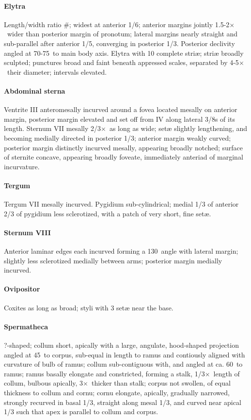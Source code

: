 \documentclass[fleqn,10pt,lineno]{wlpeerj} %
\newcommand{\td}{\textdegree~}
\newcommand{\x}{$\times$~}
\begin{document}
			\paragraph{Elytra}
				Length/width ratio \#; widest at anterior 1/6; anterior margins jointly 1.5-2\x wider than posterior margin of pronotum; lateral margins nearly straight and sub-parallel after anterior 1/5, converging in posterior 1/3. 
				Posterior declivity angled at 70-75\td to main body axis. Elytra with 10 complete stri{\ae}; stri{\ae} broadly sculpted; punctures broad and faint beneath appressed scales, separated by 4-5\x their diameter; intervals elevated.
			\paragraph{Abdominal sterna}
				Ventrite III anteromesally incurved around a fovea located mesally on anterior margin, posterior margin elevated and set off from IV along lateral 3/8s of its length. 
				Sternum VII mesally 2/3\x as long as wide; set{\ae} slightly lengthening, and becoming medially directed in posterior 1/3; anterior margin weakly curved; posterior margin distinctly incurved mesally, appearing broadly notched; surface of sternite concave, appearing broadly foveate, immediately anteriad of marginal incurvature.
			\paragraph{Tergum}
				Tergum VII mesally incurved.
				Pygidium sub-cylindrical; medial 1/3 of anterior 2/3 of pygidium less sclerotized, with a patch of very short, fine set{\ae}.
			\paragraph{Sternum VIII}
				Anterior laminar edges each incurved forming a 130\td angle with lateral margin; slightly less sclerotized medially between arms; posterior margin medially incurved.
			\paragraph{Ovipositor}
				Coxites as long as broad; styli with 3 set{\ae} near the base.
			\paragraph{Spermatheca}
				?-shaped; collum short, apically with a large, angulate, hood-shaped projection angled at 45\td to corpus, sub-equal in length to ramus and contiously aligned with curvature of bulb of ramus; collum sub-contiguous with, and angled at ca. 60\td to ramus; ramus basally elongate and constricted, forming a stalk, 1/3\x length of collum, bulbous apically, 3\x thicker than stalk; corpus not swollen, of equal thickness to collum and cornu; cornu elongate, apically, gradually narrowed, strongly recurved in basal 1/3, straight along mesal 1/3, and curved near apical 1/3 such that apex is parallel to collum and corpus.
\end{document}
